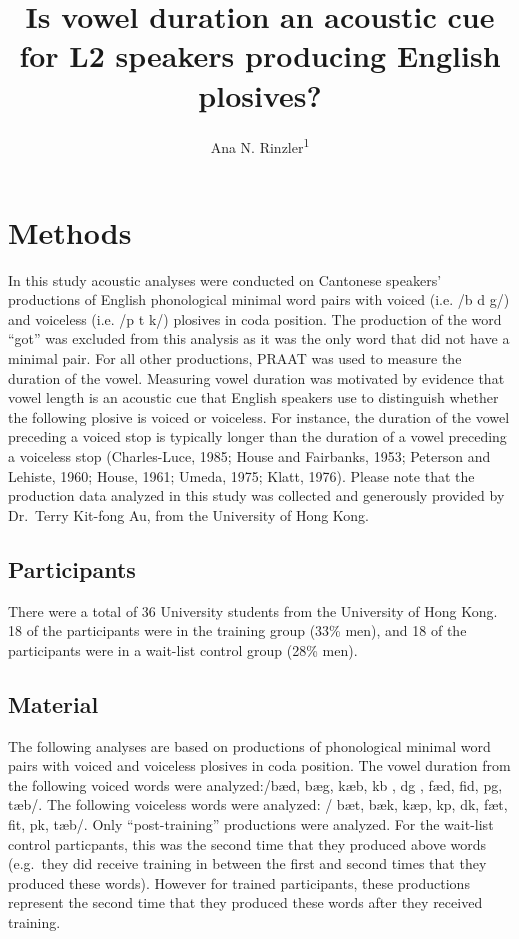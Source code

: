 \documentclass[man]{apa6}
\title{Is vowel duration an acoustic cue for L2 speakers producing English
plosives?}
\author{Ana N. Rinzler\textsuperscript{1}}
\affiliation{
    \vspace{0.5cm}
          \textsuperscript{1} Rutgers University, the State University of New Jersey\\
          \textsuperscript{}   }
\theoremstyle{definition}
\theoremstyle{definition}
\theoremstyle{definition}
\theoremstyle{remark}
\begin{document}
\maketitle

\setcounter{secnumdepth}{0}



\section{Methods}\label{methods}

In this study acoustic analyses were conducted on Cantonese speakers'
productions of English phonological minimal word pairs with voiced (i.e.
/b d g/) and voiceless (i.e. /p t k/) plosives in coda position. The
production of the word \enquote{got} was excluded from this analysis as
it was the only word that did not have a minimal pair. For all other
productions, PRAAT was used to measure the duration of the vowel.
Measuring vowel duration was motivated by evidence that vowel length is
an acoustic cue that English speakers use to distinguish whether the
following plosive is voiced or voiceless. For instance, the duration of
the vowel preceding a voiced stop is typically longer than the duration
of a vowel preceding a voiceless stop (Charles-Luce, 1985; House and
Fairbanks, 1953; Peterson and Lehiste, 1960; House, 1961; Umeda, 1975;
Klatt, 1976). Please note that the production data analyzed in this
study was collected and generously provided by Dr.~Terry Kit-fong Au,
from the University of Hong Kong.

\subsection{Participants}\label{participants}

There were a total of 36 University students from the University of Hong
Kong. 18 of the participants were in the training group (33\% men), and
18 of the participants were in a wait-list control group (28\% men).

\subsection{Material}\label{material}

The following analyses are based on productions of phonological minimal
word pairs with voiced and voiceless plosives in coda position. The
vowel duration from the following voiced words were analyzed:/b\ae d,
bæg, k\ae b, k\textturnv b , d\textopeno g , f\ae d, fid, p\textsci g,
t\ae b/. The following voiceless words were analyzed: / b\ae t, b\ae k,
k\ae p, k\textturnv p, d\textscripta k, f\ae t, fit, p\textsci k,
t\ae b/. Only \enquote{post-training} productions were analyzed. For the
wait-list control particpants, this was the second time that they
produced above words (e.g.~they did receive training in between the
first and second times that they produced these words). However for
trained participants, these productions represent the second time that
they produced these words after they received training.
\end{document}
